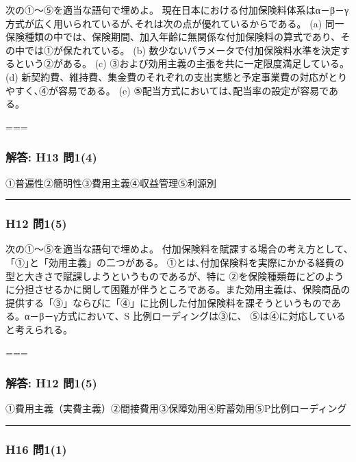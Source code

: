 \documentclass[
]{article}
\begin{document}
次の①～⑤を適当な語句で埋めよ。
現在日本における付加保険料体系はα－β－γ方式が広く用いられているが､それは次の点が優れているからである。
(a)
同一保険種類の中では、保険期間、加入年齢に無関係な付加保険料の算式であり、その中では①が保たれている。
(b) 数少ないパラメータで付加保険料水準を決定するという②がある。 (c)
③および効用主義の主張を共に一定限度満足している。 (d)
新契約費、維持費、集金費のそれぞれの支出実態と予定事業費の対応がとりやすく､④が容易である。
(e) ⑤配当方式においては､配当率の設定が容易である。

===

\hypertarget{ux89e3ux7b54-h13-ux554f14}{%
\subsubsection{解答: H13 問1(4)}\label{ux89e3ux7b54-h13-ux554f14}}

①普遍性②簡明性③費用主義④収益管理⑤利源別

\begin{center}\rule{0.5\linewidth}{0.5pt}\end{center}

\hypertarget{h12-ux554f15}{%
\subsubsection{H12 問1(5)}\label{h12-ux554f15}}

次の①～⑤を適当な語句で埋めよ。
付加保険料を賦課する場合の考え方として､「①｣と「効用主義」の二つがある。
①とは､付加保険料を実際にかかる経費の型と大きさで賦課しようというものであるが、特に
②を保険種類毎にどのように分担させるかに関して困難が伴うところである。また効用主義は、保険商品の提供する「③」ならびに「④」に比例した付加保険料を課そうというものである。α－β－γ方式において、S
比例ローディングは③に、 ⑤は④に対応していると考えられる。

===

\hypertarget{ux89e3ux7b54-h12-ux554f15}{%
\subsubsection{解答: H12 問1(5)}\label{ux89e3ux7b54-h12-ux554f15}}

①費用主義（実費主義）②間接費用③保障効用④貯蓄効用⑤P比例ローディング

\begin{center}\rule{0.5\linewidth}{0.5pt}\end{center}

\hypertarget{h16-ux554f11}{%
\subsubsection{H16 問1(1)}\label{h16-ux554f11}}
\end{document}
